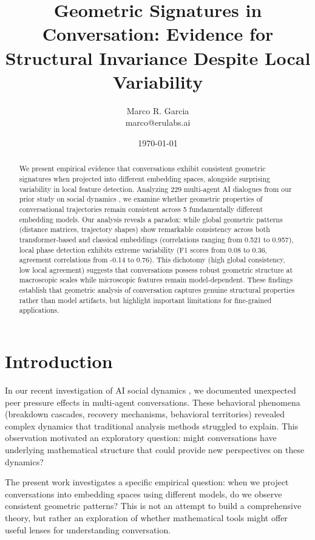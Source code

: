 \documentclass[11pt,letterpaper]{article}
\title{Geometric Signatures in Conversation: Evidence for Structural Invariance Despite Local Variability}
\author{
Marco R. Garcia \\
marco@erulabs.ai
}
\date{\today}
\newcommand{\totalConversations}{229}
\newcommand{\numEmbeddingModels}{5}
\newcommand{\minPairwiseCorr}{0.521}
\newcommand{\maxPairwiseCorr}{0.957}
\begin{document}
\maketitle

\begin{abstract}
We present empirical evidence that conversations exhibit consistent geometric signatures when projected into different embedding spaces, alongside surprising variability in local feature detection. Analyzing \totalConversations{} multi-agent AI dialogues from our prior study on social dynamics \citep{garcia2025peer}, we examine whether geometric properties of conversational trajectories remain consistent across \numEmbeddingModels{} fundamentally different embedding models. Our analysis reveals a paradox: while global geometric patterns (distance matrices, trajectory shapes) show remarkable consistency across both transformer-based and classical embeddings (correlations ranging from \minPairwiseCorr{} to \maxPairwiseCorr{}), local phase detection exhibits extreme variability (F1 scores from 0.08 to 0.36, agreement correlations from -0.14 to 0.76). This dichotomy (high global consistency, low local agreement) suggests that conversations possess robust geometric structure at macroscopic scales while microscopic features remain model-dependent. These findings establish that geometric analysis of conversation captures genuine structural properties rather than model artifacts, but highlight important limitations for fine-grained applications.
\end{abstract}

\section{Introduction}

In our recent investigation of AI social dynamics \citep{garcia2025peer}, we documented unexpected peer pressure effects in multi-agent conversations. These behavioral phenomena (breakdown cascades, recovery mechanisms, behavioral territories) revealed complex dynamics that traditional analysis methods struggled to explain. This observation motivated an exploratory question: might conversations have underlying mathematical structure that could provide new perspectives on these dynamics?

The present work investigates a specific empirical question: when we project conversations into embedding spaces using different models, do we observe consistent geometric patterns? This is not an attempt to build a comprehensive theory, but rather an exploration of whether mathematical tools might offer useful lenses for understanding conversation.
\end{document}
